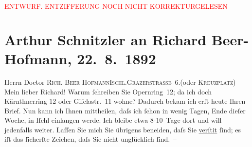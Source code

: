 
\begin{center}
            \textcolor{red}{ENTWURF. ENTZIFFERUNG NOCH NICHT KORREKTURGELESEN}
                      \end{center}
            
               \section[Arthur Schnitzler an Richard Beer-Hofmann, 22. 8. 1892]{ Arthur Schnitzler an Richard Beer-Hofmann, 22. 8. 1892}\nopagebreak{}\rehead{ }\begin{ledgroupsized}[t]{13cm}\normalsize\beginnumbering{} \toendnotes[C]{\smallbreak\pagebreak[2]} 
\toendnotes[C]{\smallbreak}\pstart{}{\pb}Herrn Doctor \textsc{Rich. Beer-Hofmann}\pend{}\pstart{}\textsc{Ischl.}\pend{}\pstart{}\textsc{Grazerstraße 6}.\pend{}\pstart{}(oder \textsc{Kreuzplatz})\pend{}{\bigskip}\pstart
           \noindent{}{\pb}Mein lieber Richard! Warum ſchreiben Sie Opernring 12; da ich doch Kärnthnerring
                  12 oder Giſelastr. 11 wohne?
               Dadurch bekam ich erſt heute Ihren Brief. Nun kann ich Ihnen mittheilen, daſs ich
               ſchon in wenig Tagen, Ende dieſer Woche, in Iſchl
               einlangen werde. Ich bleibe etwa 8-10 Tage dort und will jedenfalls weiter. Laſſen
               Sie mich Sie übrigens beneiden, {\pb}daſs Sie \uline{verſti{\geminationm}t}{ }ſind; es iſt das
               ſicherſte Zeichen, daſs Sie nicht unglücklich ſind. –\pend

\end{ledgroupsized}
